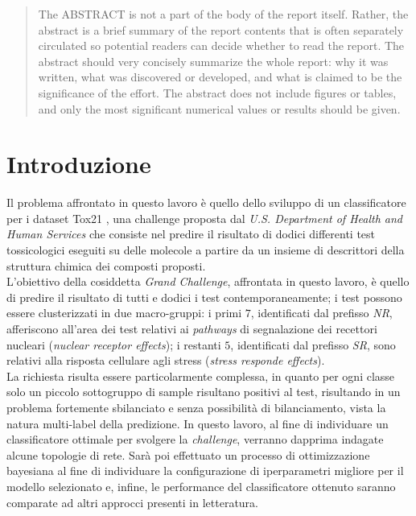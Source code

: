 \begin{abstract}
The ABSTRACT is not a part of the body of the report itself. Rather, the abstract is a brief summary of the report contents that is often separately circulated so potential readers can decide whether to read the report. The abstract should very concisely summarize the whole report: why it was written, what was discovered or developed, and what is claimed to be the significance of the effort. The abstract does not include figures or tables, and only the most significant numerical values or results should be given.
\end{abstract}

\newpage
{}
\section{Introduzione}
Il problema affrontato in questo lavoro è quello dello sviluppo di un classificatore per i dataset Tox21 \cite{challenge_site}, una challenge proposta dal \textit{U.S. Department of Health and Human Services} che consiste nel predire il risultato di dodici differenti test tossicologici eseguiti su delle molecole a partire da un insieme di descrittori della struttura chimica dei composti proposti.\\
L'obiettivo della cosiddetta \textit{Grand Challenge}, affrontata in questo lavoro, è quello di predire il risultato di tutti e dodici i test contemporaneamente; i test possono essere clusterizzati in due macro-gruppi: i primi $7$, identificati dal prefisso \textit{NR}, afferiscono all'area dei test relativi ai \textit{pathways} di segnalazione dei recettori nucleari (\textit{nuclear receptor effects}); i restanti $5$, identificati dal prefisso \textit{SR}, sono relativi alla risposta cellulare agli stress (\textit{stress responde effects}).\\
La richiesta risulta essere particolarmente complessa, in quanto per ogni classe solo un piccolo sottogruppo di sample risultano positivi al test, risultando in un problema fortemente sbilanciato e senza possibilità di bilanciamento, vista la natura multi-label della predizione.
In questo lavoro, al fine di individuare un classificatore ottimale per svolgere la \textit{challenge}, verranno dapprima indagate alcune topologie di rete. Sarà poi effettuato un processo di ottimizzazione bayesiana al fine di individuare la configurazione di iperparametri migliore per il modello selezionato e, infine, le performance del classificatore ottenuto saranno comparate ad altri approcci presenti in letteratura.